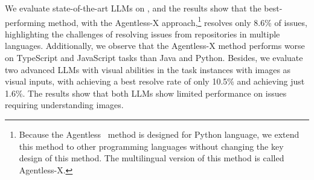 


We evaluate state-of-the-art LLMs on \Swebenchx, and the results show that the best-performing method, \GPT with the Agentless-X approach,\footnote{Because the Agentless~\cite{xia2024agentless} method is designed for Python language, we extend this method to other programming languages without changing the key design of this method. The multilingual version of this method is called Agentless-X.} resolves only 8.6\% of issues, highlighting the challenges of resolving issues from repositories in multiple languages. Additionally, we observe that the Agentless-X method performs worse on TypeScript and JavaScript tasks than Java and Python. Besides, we evaluate two advanced LLMs with visual abilities in the task instances with images as visual inputs, with \Claude achieving a best resolve rate of only 10.5\% and \GPT achieving just 1.6\%. The results show that both LLMs show limited performance on issues requiring understanding images.




